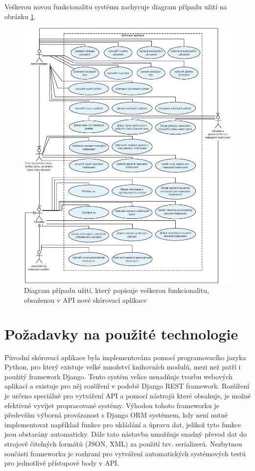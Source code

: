 \documentclass[
  digital, %
  twoside, %
  table,   %
  lof,     %
  lot,     %
]{fithesis3}
\begin{document}
Veškerou novou funkcionalitu systému zachycuje diagram případu užití na obrázku \ref{fig:useCase2}.

\begin{figure}
    \centering
    \includegraphics[width=15cm]{images/Use-case-2.eps}
    \caption{Diagram případu užití, který popisuje veškerou funkcionalitu, obsaženou v API nové skórovací aplikace}
    \label{fig:useCase2}
\end{figure}

\section{Požadavky na použité technologie}

Původní skórovací aplikace byla implementována pomocí programovacího jazyka Python, pro který existuje velké množství knihovních modulů, mezi než patří i použitý framework Django. Tento systém velice usnadňuje tvorbu webových aplikací a existuje pro něj rozšíření v podobě Django REST framework. Rozšíření je určeno speciálně pro vytváření API a pomocí nástrojů které obsahuje, je možné efektivně vyvíjet propracované systémy. Výhodou tohoto frameworku je především výborná provázanost s Django ORM systémem, kdy není nutné implementovat například funkce pro ukládání a úpravu dat, jelikož tyto funkce jsou obstarány automaticky. Dále tato nástavba umožňuje snadný převod dat do strojově čitelných formátů (JSON, XML) za použití tzv. serializerů. Nezbytnou součástí frameworku je rozhraní pro vytváření automatických systémových testů pro jednotlivé přístupové body v API.
\end{document}
